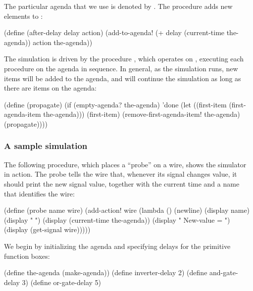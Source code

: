 \noindent
The particular agenda that we use is denoted by .  The
procedure  adds new elements to :

\begin{codeBlock}
(define (after-delay delay action)
  (add-to-agenda! (+ delay (current-time the-agenda))
                  action
                  the-agenda))
\end{codeBlock}

\noindent
The simulation is driven by the procedure , which operates on
, executing each procedure on the agenda in sequence.  In
general, as the simulation runs, new items will be added to the agenda, and
 will continue the simulation as long as there are items on the
agenda:

\begin{codeBlock}
(define (propagate)
  (if (empty-agenda? the-agenda)
      'done
      (let ((first-item
              (first-agenda-item the-agenda)))
        (first-item)
        (remove-first-agenda-item! the-agenda)
        (propagate))))
\end{codeBlock}

\subsubsection*{A sample simulation}

The following procedure, which places a ``probe'' on a wire, shows the
simulator in action.  The probe tells the wire that, whenever its signal
changes value, it should print the new signal value, together with the current
time and a name that identifies the wire:

\begin{codeBlock}
(define (probe name wire)
  (add-action! wire
               (lambda ()
                 (newline)
                 (display name) (display " ")
                 (display (current-time the-agenda))
                 (display "  New-value = ")
                 (display (get-signal wire)))))
\end{codeBlock}

\noindent
We begin by initializing the agenda and specifying delays for the primitive
function boxes:

\begin{codeBlock}
(define the-agenda (make-agenda))
(define inverter-delay 2)
(define and-gate-delay 3)
(define or-gate-delay 5)
\end{codeBlock}


